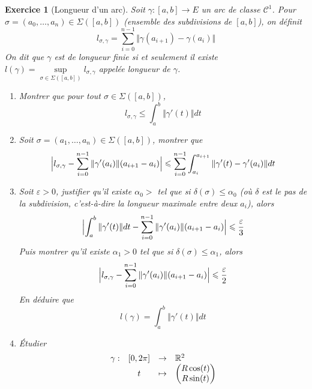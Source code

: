 \documentclass[12pt]{article}
\newtheorem{exercise}{Exercice}[section]
\theoremstyle{remark}
\theoremstyle{remark}
\newcommand{\function}[5]{
	$$
	\begin{array}{rccl}
		#1: & #2 & \to & #3 \\
		& #4 & \mapsto & #5
	\end{array}
	$$
}
\begin{document}
\begin{exercise}[Longueur d'un arc]
	Soit $\gamma\colon[a,b]\to E$ un arc de classe $\mathcal{C}^{1}$. Pour $\sigma=(a_{0},\dots,a_{n})\in\Sigma([a,b])$ (ensemble des subdivisions de $[a,b]$), on définit 
	$$l_{\sigma,\gamma}=\sum_{i=0}^{n-1}\Vert \gamma(a_{i+1})-\gamma(a_{i})\Vert$$
	On dit que $\gamma$ est de longueur finie si et seulement il existe $l(\gamma)=\sup\limits_{\sigma\in\Sigma([a,b])}l_{\sigma,\gamma}$ appelée longueur de $\gamma$.

	\begin{enumerate}
		\item Montrer que pour tout $\sigma\in\Sigma([a,b])$, 
		$$l_{\sigma,\gamma}\leqslant\int_{a}^{b}\Vert\gamma'(t)\Vert dt$$
		
		\item Soit $\sigma=(a_{1},\dots,a_{n})\in\Sigma([a,b])$, montrer que 
		$$\Bigl\vert l_{\sigma,\gamma}-\sum_{i=0}^{n-1}\Vert\gamma'(a_{i})\Vert (a_{i+1}-a_{i})\Bigr\vert\leqslant\sum_{i=0}^{n-1}\int_{a_{i}}^{a_{i+1}}\Vert\gamma'(t)-\gamma'(a_{i})\Vert dt$$
		
		\item Soit $\varepsilon>0$, justifier qu'il existe $\alpha_{0}>$ tel que si $\delta(\sigma)\leqslant\alpha_{0}$ (où $\delta$ est le pas de la subdivision, c'est-à-dire la longueur maximale entre deux $a_{i}$), alors 
		$$\Bigl\vert\int_{a}^{b}\Vert \gamma'(t)\Vert dt-\sum_{i=0}^{n-1}\Vert\gamma'(a_{i})\Vert(a_{i+1}-a_{i})\Bigr\vert\leqslant\frac{\varepsilon}{3}$$
		Puis montrer qu'il existe $\alpha_{1}>0$ tel que si $\delta(\sigma)\leqslant\alpha_{1}$, alors 
		$$\Bigl\vert l_{\sigma,\gamma}-\sum_{i=0}^{n-1}\Vert\gamma'(a_{i})\Vert(a_{i+1}-a_{i})\Bigr\vert\leqslant\frac{\varepsilon}{2}$$
		En déduire que 
		$$l(\gamma)=\int_{a}^{b}\Vert\gamma'(t)\Vert dt$$
		
		\item Étudier \function{\gamma}{[0,2\pi]}{\R^{2}}{t}{\begin{pmatrix}
			R\cos(t)\\ R\sin(t)
		\end{pmatrix}}
	\end{enumerate}
\end{exercise}
\end{document}
